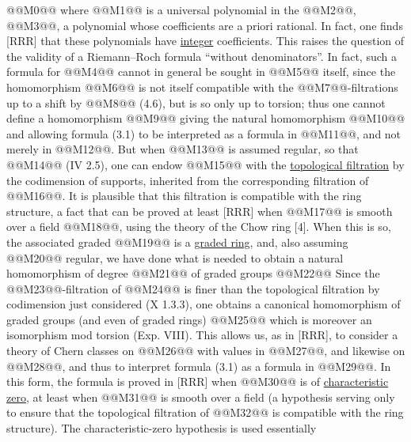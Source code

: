 @@M0@@
where @@M1@@ is a universal polynomial in the @@M2@@, @@M3@@, a polynomial whose coefficients are a priori rational. In fact, one finds [RRR] that these polynomials have \uline{integer} coefficients. This raises the question of the validity of a Riemann--Roch formula ``without denominators''. In fact, such a formula for @@M4@@ cannot in general be sought in @@M5@@ itself, since the homomorphism @@M6@@ is not itself compatible with the @@M7@@-filtrations up to a shift by @@M8@@ (4.6), but is so only up to torsion; thus one cannot define a homomorphism @@M9@@ giving the natural homomorphism @@M10@@ and allowing formula (3.1) to be interpreted as a formula in @@M11@@, and not merely in @@M12@@. But when @@M13@@ is assumed regular, so that @@M14@@ (IV 2.5), one can endow @@M15@@ with the \uline{topological filtration} by the codimension of supports, inherited from the corresponding filtration of @@M16@@. It is plausible that this filtration is compatible with the ring structure, a fact that can be proved at least [RRR] when @@M17@@ is smooth over a field @@M18@@, using the theory of the Chow ring [4]. When this is so, the associated graded
@@M19@@
is a \uline{graded ring}, and, also assuming @@M20@@ regular, we have done what is needed to obtain a natural homomorphism of degree @@M21@@ of graded groups
@@M22@@
Since the @@M23@@-filtration of @@M24@@ is finer than the topological filtration by codimension just considered (X 1.3.3), one obtains a canonical homomorphism of graded groups (and even of graded rings)
@@M25@@
which is moreover an isomorphism mod torsion (Exp. VIII). This allows us, as in [RRR], to consider a theory of Chern classes on @@M26@@ with values in @@M27@@, and likewise on @@M28@@, and thus to interpret formula (3.1) as a formula in @@M29@@. In this form, the formula is proved in [RRR] when @@M30@@ is of \uline{characteristic zero}, at least when @@M31@@ is smooth over a field (a hypothesis serving only to ensure that the topological filtration of @@M32@@ is compatible with the ring structure). The characteristic-zero hypothesis is used essentially
